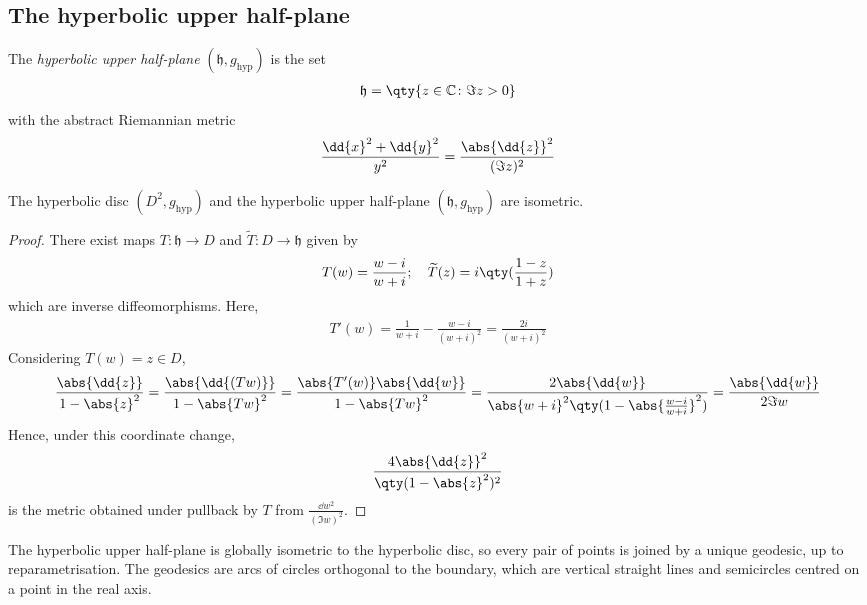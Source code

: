 \subsection{The hyperbolic upper half-plane}
\begin{definition}
	The \textit{hyperbolic upper half-plane} $(\mathfrak{h},g_{\text{hyp}})$ is the set
	\begin{align*}
		\mathfrak{h} = \qty{z \in \mathbb C \colon \Im z > 0}
	\end{align*}
	with the abstract Riemannian metric
	\begin{align*}
		\frac{\dd{x}^2 + \dd{y}^2}{y^2} = \frac{\abs{\dd{z}}^2}{(\Im z)^2}
	\end{align*}
\end{definition}
\begin{lemma}
	The hyperbolic disc $(D^2, g_{\text{hyp}})$ and the hyperbolic upper half-plane $(\mathfrak{h},g_{\text{hyp}})$ are isometric.
\end{lemma}
\begin{proof}
	There exist maps $T \colon \mathfrak{h} \to D$ and $\widetilde T \colon D \to \mathfrak{h}$ given by
	\begin{align*}
		T(w) = \frac{w-i}{w+i};\quad \widetilde T(z) = i\qty(\frac{1-z}{1+z})
	\end{align*}
	which are inverse diffeomorphisms.
	Here,
	\begin{align*}
		T'(w) = \frac{1}{w+i} - \frac{w-i}{(w+i)^2} = \frac{2i}{(w+i)^2}
	\end{align*}
	Considering $T(w) = z \in D$,
	\begin{align*}
		\frac{\abs{\dd{z}}}{1-\abs{z}^2} = \frac{\abs{\dd{(Tw)}}}{1-\abs{T w}^2} = \frac{\abs{T'(w)} \abs{\dd{w}}}{1-\abs{Tw}^2} = \frac{2 \abs{\dd{w}}}{\abs{w+i}^2 \qty(1 - \abs{\frac{w-i}{w+i}}^2)} = \frac{\abs{\dd{w}}}{2\Im w}
	\end{align*}
	Hence, under this coordinate change,
	\begin{align*}
		\frac{4 \abs{\dd{z}}^2}{\qty(1 - \abs{z}^2)^2}
	\end{align*}
	is the metric obtained under pullback by $T$ from $\frac{\dd{w}^2}{(\Im w)^2}$.
\end{proof}
\begin{corollary}
	The hyperbolic upper half-plane is globally isometric to the hyperbolic disc, so every pair of points is joined by a unique geodesic, up to reparametrisation.
	The geodesics are arcs of circles orthogonal to the boundary, which are vertical straight lines and semicircles centred on a point in the real axis.
\end{corollary}
